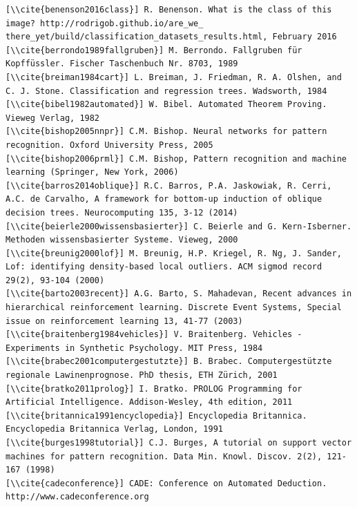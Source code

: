 \documentclass[10pt]{book}
\begin{document}
\begin{verbatim}
[\\cite{benenson2016class}] R. Benenson. What is the class of this image? http://rodrigob.github.io/are_we_ there_yet/build/classification_datasets_results.html, February 2016
[\\cite{berrondo1989fallgruben}] M. Berrondo. Fallgruben für Kopffüssler. Fischer Taschenbuch Nr. 8703, 1989
[\\cite{breiman1984cart}] L. Breiman, J. Friedman, R. A. Olshen, and C. J. Stone. Classification and regression trees. Wadsworth, 1984
[\\cite{bibel1982automated}] W. Bibel. Automated Theorem Proving. Vieweg Verlag, 1982
[\\cite{bishop2005nnpr}] C.M. Bishop. Neural networks for pattern recognition. Oxford University Press, 2005
[\\cite{bishop2006prml}] C.M. Bishop, Pattern recognition and machine learning (Springer, New York, 2006)
[\\cite{barros2014oblique}] R.C. Barros, P.A. Jaskowiak, R. Cerri, A.C. de Carvalho, A framework for bottom-up induction of oblique decision trees. Neurocomputing 135, 3-12 (2014)
[\\cite{beierle2000wissensbasierter}] C. Beierle and G. Kern-Isberner. Methoden wissensbasierter Systeme. Vieweg, 2000
[\\cite{breunig2000lof}] M. Breunig, H.P. Kriegel, R. Ng, J. Sander, Lof: identifying density-based local outliers. ACM sigmod record 29(2), 93-104 (2000)
[\\cite{barto2003recent}] A.G. Barto, S. Mahadevan, Recent advances in hierarchical reinforcement learning. Discrete Event Systems, Special issue on reinforcement learning 13, 41-77 (2003)
[\\cite{braitenberg1984vehicles}] V. Braitenberg. Vehicles - Experiments in Synthetic Psychology. MIT Press, 1984
[\\cite{brabec2001computergestutzte}] B. Brabec. Computergestützte regionale Lawinenprognose. PhD thesis, ETH Zürich, 2001
[\\cite{bratko2011prolog}] I. Bratko. PROLOG Programming for Artificial Intelligence. Addison-Wesley, 4th edition, 2011
[\\cite{britannica1991encyclopedia}] Encyclopedia Britannica. Encyclopedia Britannica Verlag, London, 1991
[\\cite{burges1998tutorial}] C.J. Burges, A tutorial on support vector machines for pattern recognition. Data Min. Knowl. Discov. 2(2), 121-167 (1998)
[\\cite{cadeconference}] CADE: Conference on Automated Deduction. http://www.cadeconference.org

\end{verbatim}
\end{document}
